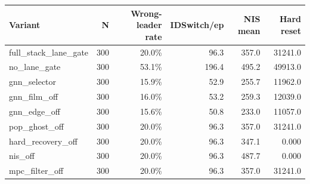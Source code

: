 \begin{tabular}{lrrrrr}
\toprule
\textbf{Variant} & \textbf{N} & \textbf{Wrong-leader rate} & \textbf{IDSwitch/ep} & \textbf{NIS mean} & \textbf{Hard reset} \\
\midrule
full\_stack\_lane\_gate & 300 & 20.0\% & 96.3 & 357.0 & 31241.0 \\
no\_lane\_gate & 300 & 53.1\% & 196.4 & 495.2 & 49913.0 \\
gnn\_selector & 300 & 15.9\% & 52.9 & 255.7 & 11962.0 \\
gnn\_film\_off & 300 & 16.0\% & 53.2 & 259.3 & 12039.0 \\
gnn\_edge\_off & 300 & 15.6\% & 50.8 & 233.0 & 11057.0 \\
pop\_ghost\_off & 300 & 20.0\% & 96.3 & 357.0 & 31241.0 \\
hard\_recovery\_off & 300 & 20.0\% & 96.3 & 347.1 & 0.000 \\
nis\_off & 300 & 20.0\% & 96.3 & 487.7 & 0.000 \\
mpc\_filter\_off & 300 & 20.0\% & 96.3 & 357.0 & 31241.0 \\
\bottomrule
\end{tabular}
